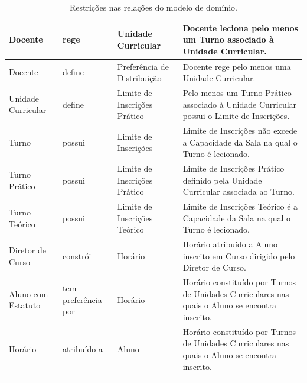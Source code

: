 \documentclass[12pt, a4paper]{article}
\makeatletter
\renewcommand\section[1]{
    \newpage
    \thispagestyle{empty}
    \vspace*{\fill}
    \@startsection{section}{1}{\z@}{0px}{50px}{\normalfont\Huge\bfseries}{#1}
    \vspace*{\fill}
    \newpage
}
\makeatother
\begin{document}
\begin{longtable}{|>{\centering}m{2.5cm}
                  |>{\centering}m{2.5cm}
                  |>{\centering}m{2.5cm}
                  |m{8cm}|}
    \hline
    Docente            &
    rege               &
    Unidade Curricular &
    Docente leciona pelo menos um Turno associado à Unidade Curricular. \\

    \hline
    Docente                     &
    define                      &
    Preferência de Distribuição &
    Docente rege pelo menos uma Unidade Curricular. \\

    \hline
    \newpage
    Unidade Curricular           &
    define                       &
    Limite de Inscrições Prático &
    Pelo menos um Turno Prático associado à Unidade Curricular possui o Limite de Inscrições. \\

    \hline
    Turno                &
    possui               &
    Limite de Inscrições &
    Limite de Inscrições não excede a Capacidade da Sala na qual o Turno é lecionado. \\

    \hline
    Turno Prático                &
    possui                       &
    Limite de Inscrições Prático &
    Limite de Inscrições Prático definido pela Unidade Curricular associada ao Turno. \\

    \hline
    Turno Teórico                &
    possui                       &
    Limite de Inscrições Teórico &
    Limite de Inscrições Teórico é a Capacidade da Sala na qual o Turno é lecionado. \\

    \hline
    Diretor de Curso &
    constrói         &
    Horário          &
    Horário atribuído a Aluno inscrito em Curso dirigido pelo Diretor de Curso. \\

    \hline
    Aluno com Estatuto  &
    tem preferência por &
    Horário             &
    Horário constituído por Turnos de Unidades Curriculares nas quais o Aluno se encontra
    inscrito. \\

    \hline
    Horário     &
    atribuído a &
    Aluno       &
    Horário constituído por Turnos de Unidades Curriculares nas quais o Aluno se encontra
    inscrito. \\

    \hline
    \caption{Restrições nas relações do modelo de domínio.}
\end{longtable}

\section{Casos de Uso}
\end{document}
